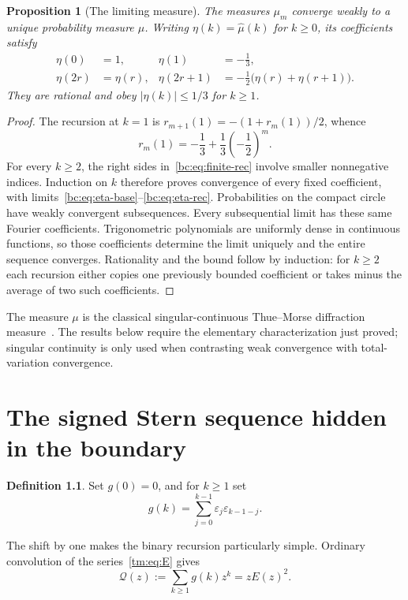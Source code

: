 \documentclass[11pt,a4paper,oneside,openany]{book}
\numberwithin{equation}{chapter}
\newtheorem{proposition}[theorem]{Proposition}
\theoremstyle{definition}
\newtheorem{definition}[theorem]{Definition}
\theoremstyle{remark}
\newcommand{\eps}{\varepsilon}
\begin{document}
\begin{proposition}[The limiting measure]
\label{bc:prop:limit}
The measures $\mu_m$ converge weakly to a unique probability measure $\mu$.
Writing $\eta(k)=\widehat\mu(k)$ for $k\ge0$, its coefficients satisfy
\begin{align}
 \eta(0)&=1,&\eta(1)&=-\frac13,\label{bc:eq:eta-base}\\
 \eta(2r)&=\eta(r),&
 \eta(2r+1)&=-\frac12\bigl(\eta(r)+\eta(r+1)\bigr).
 \label{bc:eq:eta-rec}
\end{align}
They are rational and obey $|\eta(k)|\le1/3$ for $k\ge1$.
\end{proposition}
\begin{proof}
The recursion at $k=1$ is
$r_{m+1}(1)=-(1+r_m(1))/2$, whence
\begin{equation}
 r_m(1)=-\frac13+\frac13\left(-\frac12\right)^m.
 \label{bc:eq:mode-one}
\end{equation}
For every $k\ge2$, the right sides in~\eqref{bc:eq:finite-rec} involve smaller
nonnegative indices. Induction on $k$ therefore proves convergence of every fixed
coefficient, with limits~\eqref{bc:eq:eta-base}--\eqref{bc:eq:eta-rec}. Probabilities
on the compact circle have weakly convergent subsequences. Every subsequential
limit has these same Fourier coefficients. Trigonometric polynomials are uniformly
dense in continuous functions, so those coefficients determine the limit uniquely
and the entire sequence converges. Rationality and the bound follow by induction:
for $k\ge2$ each recursion either copies one previously bounded coefficient or
takes minus the average of two such coefficients.
\end{proof}
The measure $\mu$ is the classical singular-continuous Thue--Morse diffraction
measure~\cite{baake-grimm}. The results below require the elementary characterization
just proved; singular continuity is only used when contrasting weak convergence
with total-variation convergence.
\chapter{The signed Stern sequence hidden in the boundary}
\label{bc:sec:stern}

\begin{definition}
Set $g(0)=0$, and for $k\ge1$ set
\begin{equation}
 g(k)=\sum_{j=0}^{k-1}\eps_j\eps_{k-1-j}.
 \label{bc:eq:g-convolution}
\end{equation}
\end{definition}
The shift by one makes the binary recursion particularly simple. Ordinary
convolution of the series~\eqref{tm:eq:E} gives
\begin{equation}
 \mathcal Q(z):=\sum_{k\ge1}g(k)z^k=zE(z)^2.
 \label{bc:eq:Q}
\end{equation}
\end{document}
